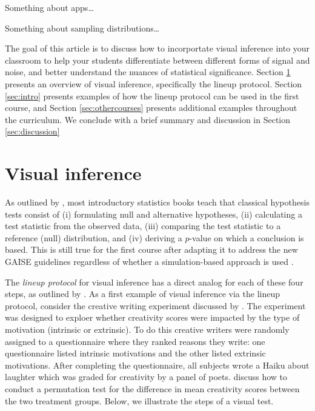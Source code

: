 \documentclass[12pt]{article}
\begin{document}
Something about apps\ldots{}

Something about sampling distributions\ldots{}

The goal of this article is to discuss how to incorportate visual
inference into your classroom to help your students differentiate
between different forms of signal and noise, and better understand the
nuances of statistical significance. Section \ref{sec:vizinf} presents
an overview of visual inference, specifically the lineup protocol.
Section \ref{sec:intro} presents examples of how the lineup protocol can
be used in the first course, and Section \ref{sec:othercourses} presents
additional examples throughout the curriculum. We conclude with a brief
summary and discussion in Section \ref{sec:discussion}

\section{Visual inference}
\label{sec:vizinf}

As outlined by \citet{Cobb-2007uo}, most introductory statistics books
teach that classical hypothesis tests consist of (i) formulating null
and alternative hypotheses, (ii) calculating a test statistic from the
observed data, (iii) comparing the test statistic to a reference (null)
distribution, and (iv) deriving a \(p\)-value on which a conclusion is
based. This is still true for the first course after adapting it to
address the new GAISE guidelines regardless of whether a
simulation-based approach is used
\citep[cf.][]{Lock2012, tintle2015, introstats}.

The \emph{lineup protocol} for visual inference has a direct analog for
each of these four steps, as outlined by \citet{Buja-2009bd}. As a first
example of visual inference via the lineup protocol, consider the
creative writing experiment discussed by \citep[pp.~2--14]{ramsey2013}.
The experiment was designed to exploer whether creativity scores were
impacted by the type of motivation (intrinsic or extrinsic). To do this
creative writers were randomly assigned to a questionnaire where they
ranked reasons they write: one questionnaire listed intrinsic
motivations and the other listed extrinsic motivations. After completing
the questionnaire, all subjects wrote a Haiku about laughter which was
graded for creativity by a panel of poets. \citet{ramsey2013} discuss
how to conduct a permutation test for the difference in mean creativity
scores between the two treatment groups. Below, we illustrate the steps
of a visual test.
\end{document}
